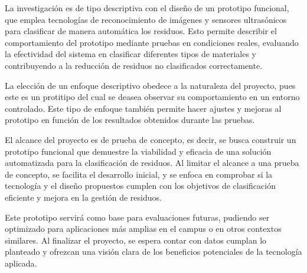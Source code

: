 La investigación es de tipo descriptiva con el diseño de un prototipo funcional, que emplea tecnologías de reconocimiento de imágenes y sensores ultrasónicos para clasificar de manera automática los residuos. Esto permite describir el comportamiento del prototipo mediante pruebas en condiciones reales, evaluando la efectividad del sistema en clasificar diferentes tipos de materiales y contribuyendo a la reducción de residuos no clasificados correctamente.

La elección de un enfoque descriptivo obedece a la naturaleza del proyecto, pues este es un protitipo del cual se deasea observar su comportamiento en un entorno controlado. Este tipo de enfoque también permite hacer ajustes y mejoras al prototipo en función de los resultados obtenidos durante las pruebas.

El alcance del proyecto es de prueba de concepto, es decir, se busca construir un prototipo funcional que demuestre la viabilidad y eficacia de una solución automatizada para la clasificación de residuos. Al limitar el alcance a una prueba de concepto, se facilita el desarrollo inicial, y se enfoca en comprobar si la tecnología y el diseño propuestos cumplen con los objetivos de clasificación eficiente y mejora en la gestión de residuos.

Este prototipo servirá como base para evaluaciones futuras, pudiendo ser optimizado para aplicaciones más amplias en el campus o en otros contextos similares. Al finalizar el proyecto, se espera contar con datos cumplan lo planteado y ofrezcan una visión clara de los beneficios potenciales de la tecnología aplicada.